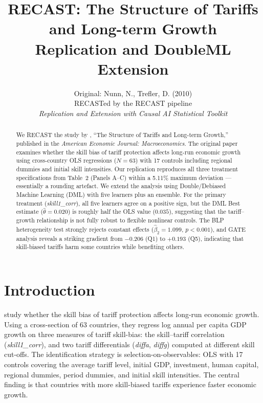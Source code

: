 \documentclass[12pt]{article}
\title{RECAST: The Structure of Tariffs and Long-term Growth\\[6pt]
  \large Replication and DoubleML Extension}
\author{Original: Nunn, N., Trefler, D. (2010)\\[3pt]
  \small RECASTed by the RECAST pipeline\\
  \small\textit{Replication and Extension with Causal AI Statistical Toolkit}}
\date{}
\begin{document}
\maketitle

\begin{abstract}
We RECAST the study by \citet{nunntrefler2010}, ``The Structure of Tariffs and Long-term Growth,''
published in the \textit{American Economic Journal: Macroeconomics}.
The original paper examines whether the skill bias of tariff protection
affects long-run economic growth using cross-country OLS regressions
($N = 63$) with 17 controls including regional dummies and initial skill
intensities. Our replication reproduces all three treatment specifications
from Table~2 (Panels A--C) within a 5.11\% maximum deviation
--- essentially a rounding artefact. We extend the analysis using
Double/Debiased Machine Learning (DML) with five learners plus an
ensemble. For the primary treatment (\textit{skill1\_corr}), all five
learners agree on a positive sign, but the DML Best estimate
($\hat\theta = 0.020$) is roughly half the OLS
value ($0.035$), suggesting that the tariff--growth
relationship is not fully robust to flexible nonlinear controls.
The BLP heterogeneity test strongly rejects constant effects
($\hat\beta_2 = 1.099$, $p < 0.001$), and GATE analysis
reveals a striking gradient from $-0.206$ (Q1) to $+0.193$ (Q5),
indicating that skill-biased tariffs harm some countries while benefiting
others.
\end{abstract}

\section{Introduction}

\citet{nunntrefler2010} study whether the skill bias of tariff protection
affects long-run economic growth. Using a cross-section of 63 countries,
they regress log annual per capita GDP growth on three measures of
tariff skill-bias: the skill--tariff correlation (\textit{skill1\_corr}),
and two tariff differentials (\textit{diffa}, \textit{diffg}) computed
at different skill cut-offs. The identification strategy is
selection-on-observables: OLS with 17 controls covering the average
tariff level, initial GDP, investment, human capital, regional dummies,
period dummies, and initial skill intensities. The central finding is
that countries with more skill-biased tariffs experience faster economic
growth.
\end{document}
